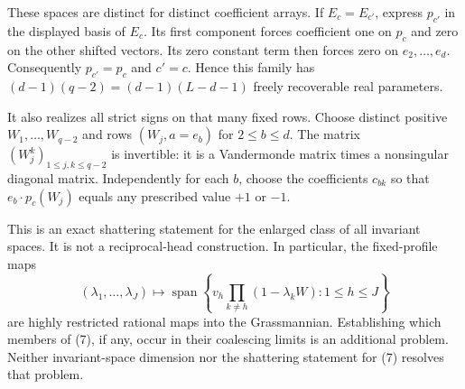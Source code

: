 \documentclass[11pt]{article}
\begin{document}
These spaces are distinct for distinct coefficient arrays. If
$E_c=E_{c'}$, express $p_{c'}$ in the displayed basis of $E_c$.
Its first component forces coefficient one on $p_c$ and zero on the
other shifted vectors. Its zero constant term then forces zero on
$e_2,\ldots,e_d$. Consequently $p_{c'}=p_c$ and $c'=c$.
Hence this family has
$(d-1)(q-2)=(d-1)(L-d-1)$ freely recoverable real parameters.

It also realizes all strict signs on that many fixed rows. Choose
distinct positive $W_1,\ldots,W_{q-2}$ and rows
$(W_j,a=e_b)$ for $2\leq b\leq d$.
The matrix $(W_j^k)_{1\leq j,k\leq q-2}$ is invertible: it is a
Vandermonde matrix times a nonsingular diagonal matrix. Independently
for each $b$, choose the coefficients $c_{bk}$ so that
$e_b\cdot p_c(W_j)$ equals any prescribed value $+1$ or $-1$.

This is an exact shattering statement for the enlarged class of all
invariant spaces. It is not a reciprocal-head construction. In
particular, the fixed-profile maps
\[
 (\lambda_1,\ldots,\lambda_J)
 \longmapsto
 \operatorname{span}\left\{
 v_h\prod_{k\ne h}(1-\lambda_kW):1\leq h\leq J\right\}
 \tag{8}
\]
are highly restricted rational maps into the Grassmannian. Establishing
which members of (7), if any, occur in their coalescing limits is an
additional problem. Neither invariant-space dimension nor the
shattering statement for (7) resolves that problem.
\end{document}
